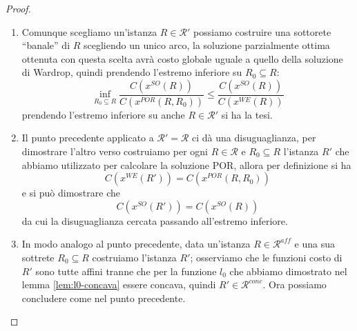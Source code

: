 \documentclass[a4paper]{article}
\theoremstyle{plain}
\theoremstyle{definition}
\theoremstyle{remark}
\newcommand{\pa}[1]{\left(#1\right)}
\begin{document}
\begin{proof}
  \begin{enumerate}
  \item Comunque scegliamo un'istanza $R\in \mathcal{R'}$ possiamo
    costruire una sottorete ``banale'' di $R$ scegliendo un unico
    arco, la soluzione parzialmente ottima ottenuta con questa scelta
    avrà costo globale uguale a quello della soluzione di Wardrop,
    quindi prendendo l'estremo inferiore su $R_0\subseteq R$:
    \[ \inf _{R_0\subseteq R}
      \frac{C\pa{x^{SO}(R)}}{C\pa{x^{POR}(R,R_0)}} \le
      \frac{C\pa{x^{SO}(R)}}{C\pa{x^{WE}(R)}} \]
    prendendo l'estremo inferiore su anche $R\in \mathcal{R}'$ si ha
    la tesi.
  \item Il punto precedente applicato a $\mathcal{R'} =\mathcal{R}$ ci
    dà una disuguaglianza, per dimostrare l'altro verso costruiamo per
    ogni $R\in \mathcal{R}$ e $R_0\subseteq R$ l'istanza $R'$ che
    abbiamo utilizzato per calcolare la soluzione POR, allora per
    definizione si ha
    \[ C\pa{x^{WE}\pa{R'}} = C\pa{x^{POR}\pa{R,R_0}} \]
    e si può dimostrare che
    \[ C\pa{x^{SO}\pa{R'}} = C\pa{x^{SO}\pa{R}} \]
    da cui la disuguaglianza cercata passando all'estremo inferiore.
  \item In modo analogo al punto precedente, data un'istanza $R\in
    \mathcal{R}^{aff}$ e una sua sottrete $R_0\subseteq R$ costruiamo
    l'istanza $R'$; osserviamo che le funzioni costo di $R'$ sono
    tutte affini tranne che per la funzione $l_0$ che abbiamo
    dimostrato nel lemma \ref{lem:l0-concava} essere concava, quindi
    $R'\in \mathcal{R}^{conc}$. Ora possiamo concludere come nel punto
    precedente.
  \end{enumerate}
\end{proof}
\end{document}
